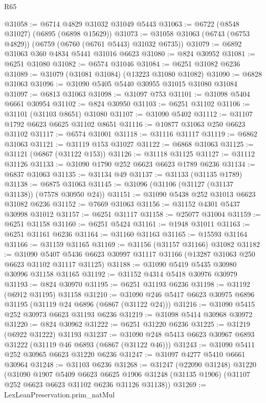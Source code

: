 \begin{lexlean}{R65}
\begin{coremodule}
{@31058 := @6714 @4829 @31032 @31049 @5443
@31063 := @6722 (@8548 @31027) (@6895 (@6898 @15629))
@31073 := @31058 @31063 (@6743 (@6753 @4829)) (@6759 (@6760 (@6761 @5443) @31032 @6735))
@31079 := @6892 @31063 @360 @4834 @5441 @31016 @6623
@31080 := @824 @30952
@31081 := @6251 @31080
@31082 := @6574 @31046
@31084 := @6251 @31082 @6236
@31089 := @31079 (@31081 @31084) (@13223 @31080 @31082)
@31090 := @6828 @31063
@31096 := @31090 @5405 @5440 @30955 @31015 @31080 @31084
@31097 := @6813 @31063
@31098 := @31097 @753
@31101 := @31098 @5404 @6661 @30954
@31102 := @824 @30950
@31103 := @6251 @31102
@31106 := @31101 (@31103 @8651) @31080
@31107 := @31090 @5402
@31112 := @31107 @1792 @6623 @6625 @31102 @8651
@31116 := @10877 @31063 @250 @6623 @31102
@31117 := @6574 @31001
@31118 := @31116 @31117
@31119 := @6862 @31063
@31121 := @31119 @153 @31027
@31122 := @6868 @31063
@31125 := @31121 (@6867 (@31122 @153))
@31126 := @31118 @31125
@31127 := @31112 @31126
@31133 := @31090 @1790 @252 @6623 @6623 @1789 @6236
@31134 := @6837 @31063
@31135 := @31134 @49
@31137 := @31133 (@31135 @1789)
@31138 := @6875 @31063
@31145 := @31096 (@31106 (@31127 (@31137 @31138)) (@7578 @30950 @24))
@31151 := @31090 @5438 @252 @31013 @6623 @31082 @6236
@31152 := @7669 @31063
@31156 := @31152 @4301 @5437 @30998 @31012
@31157 := @6251 @31117
@31158 := @25077 @31004
@31159 := @6251 @31158
@31160 := @6251 @5424
@31161 := @1948 @31011
@31163 := @6251 @31161 @6236
@31164 := @31160 @31163
@31165 := @15593 @31164
@31166 := @31159 @31165
@31169 := @31156 (@31157 @31166) @31082
@31182 := @31090
    @5407
    @5436
    @6623
    @30997
    @31117
    @31166
    (@13287 @31063 @250 @6623 @31102 @31117 @31125)
@31188 := @31090 @5419 @5435 @30980 @30996 @31158 @31165
@31192 := @31152 @4314 @5418 @30976 @30979
@31193 := @824 @30970
@31195 := @6251 @31193 @6236
@31198 := @31192 (@6912 @31195) @31158
@31210 := @31090 @246 @5417 @6623 @30975 @6896 @31195 (@31119 @24 @6896 (@6867 (@31122 @24)))
@31216 := @31090 @5415 @252 @30973 @6623 @31193 @6236
@31219 := @31098 @5414 @30968 @30972
@31220 := @824 @30962
@31222 := @6251 @31220 @6236
@31225 := @31219 (@6922 @31222) @31193
@31237 := @31090 @248 @5413 @6623 @30967 @6893 @31222 (@31119 @46 @6893 (@6867 (@31122 @46)))
@31243 := @31090 @5411 @252 @30965 @6623 @31220 @6236
@31247 := @31097 @4277 @5410 @6661 @30964
@31248 := @31103 @6236
@31268 := @31247
    (@22090 @31248)
    @31220
    (@31090
      @1907
      @5409
      @6623
      @6625
      @1906
      @31248
      (@31135 @1906)
      (@31107 @252 @6623 @6623 @31102 @6236 @31126 @31138))
@31269 := LexLeanPreservation.prim_natMul
}
\end{coremodule}
\end{lexlean}
